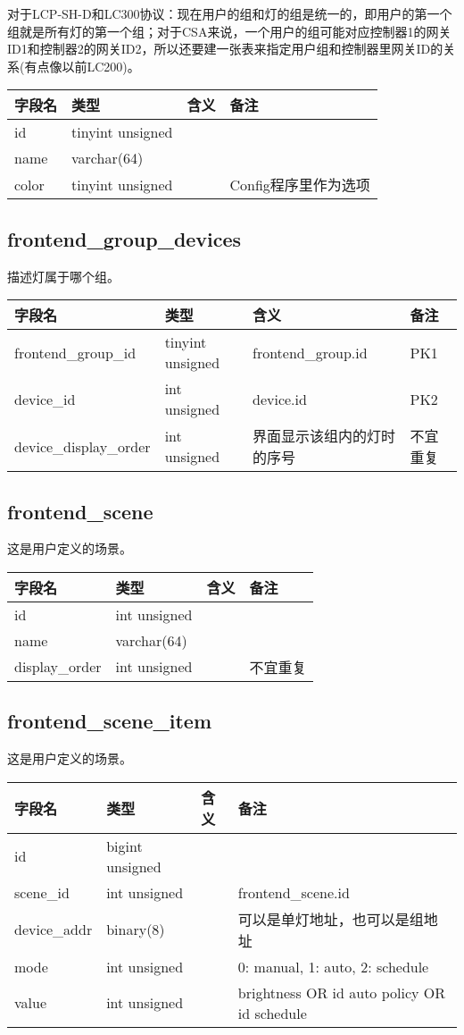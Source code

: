 对于LCP-SH-D和LC300协议：现在用户的组和灯的组是统一的，即用户的第一个组就是所有灯的第一个组；对于CSA来说，一个用户的组可能对应控制器1的网关ID1和控制器2的网关ID2，所以还要建一张表来指定用户组和控制器里网关ID的关系(有点像以前LC200)。

\begin{longtabu}[c]{@{}lXXX@{}}
\toprule
字段名 & 类型 & 含义 & 备注\tabularnewline
\midrule
\endhead
id & tinyint unsigned & &\tabularnewline
name & varchar(64) & &\tabularnewline
color & tinyint unsigned & & Config程序里作为选项\tabularnewline
\bottomrule
\end{longtabu}

\subsection{frontend\_group\_devices}\label{frontendux5fgroupux5fdevices}

描述灯属于哪个组。

\begin{longtabu}[c]{@{}lXXX@{}}
\toprule
字段名 & 类型 & 含义 & 备注\tabularnewline
\midrule
\endhead
frontend\_group\_id & tinyint unsigned & frontend\_group.id &
PK1\tabularnewline
device\_id & int unsigned & device.id & PK2\tabularnewline
device\_display\_order & int unsigned & 界面显示该组内的灯时的序号 &
不宜重复\tabularnewline
\bottomrule
\end{longtabu}

\subsection{frontend\_scene}\label{frontendux5fscene}

这是用户定义的场景。

\begin{longtabu}[c]{@{}lXXX@{}}
\toprule
字段名 & 类型 & 含义 & 备注\tabularnewline
\midrule
\endhead
id & int unsigned & &\tabularnewline
name & varchar(64) & &\tabularnewline
display\_order & int unsigned & & 不宜重复\tabularnewline
\bottomrule
\end{longtabu}

\subsection{frontend\_scene\_item}\label{frontendux5fsceneux5fitem}

这是用户定义的场景。

\begin{longtabu}[c]{@{}lXXX@{}}
\toprule
字段名 & 类型 & 含义 & 备注\tabularnewline
\midrule
\endhead
id & bigint unsigned & &\tabularnewline
scene\_id & int unsigned & & frontend\_scene.id\tabularnewline
device\_addr & binary(8) & &
可以是单灯地址，也可以是组地址\tabularnewline
mode & int unsigned & & 0: manual, 1: auto, 2: schedule\tabularnewline
value & int unsigned & & brightness OR id auto policy OR id
schedule\tabularnewline
\bottomrule
\end{longtabu}

